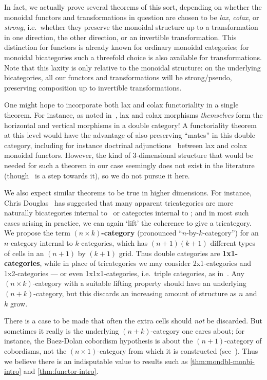 In fact, we actually prove several theorems of this sort, depending on whether the monoidal functors and transformations in question are chosen to be \emph{lax}, \emph{colax}, or \emph{strong}, i.e.\ whether they preserve the monoidal structure up to a transformation in one direction, the other direction, or an invertible transformation.
This distinction for functors is already known for ordinary monoidal categories; for monoidal bicategories such a threefold choice is also available for transformations.
Note that this laxity is only relative to the monoidal structure: on the underlying bicategories, all our functors and transformations will be strong/pseudo, preserving composition up to invertible transformations.

One might hope to incorporate both lax and colax functoriality in a single theorem.
For instance, as noted in~\cite{gp:double-adjoints,shulman:dblderived}, lax and colax morphisms \emph{themselves} form the horizontal and vertical morphisms in a double category!
A functoriality theorem at this level would have the advantage of also preserving ``mates'' in this double category, including for instance doctrinal adjunctions~\cite{kelly:doc-adjn} between lax and colax monoidal functors.
However, the kind of 3-dimensional structure that would be needed for such a theorem in our case seemingly does not exist in the literature (though~\cite{gp:intercategories-i} is a step towards it), so we do not pursue it here.

\begin{rmk}
We also expect similar theorems to be true in higher dimensions.  For
instance, Chris Douglas~\cite{douglas:tfttalk} has suggested that many
apparent tricategories are more naturally bicategories internal to
\cCat\ or categories internal to \cTwocat; and in most such cases
arising in practice, we can again `lift' the coherence to give a
tricategory.
%
We propose the term \textbf{$(n\times k)$-category}
(pronounced ``$n$-by-$k$-category'') for an $n$-category internal to
$k$-categories, which has $(n+1)(k+1)$ different types of
cells in an $(n+1)$ by $(k+1)$ grid.  Thus
double categories are \textbf{1x1-categories}, while in
place of tricategories we may consider 2x1-categories and
1x2-categories --- or even 1x1x1-categories, i.e.\ triple categories,
as in~\cite{gp:intercategories-i,gp:intercategories-ii}.  Any
$(n\times k)$-category with a suitable lifting property
should have an underlying $(n+k)$-category, but this discards an increasing amount of structure as $n$ and $k$ grow.



There is a case to be made that often the extra cells should
\emph{not} be discarded.  But sometimes
it really is the underlying $(n+k)$-category one cares about; for
instance, the Baez-Dolan cobordism hypothesis is about the $(n+1)$-category of cobordisms, not
the $(n\times 1)$-category from which it is constructed
(see~\cite{lurie:tft}).  Thus we believe there is an indisputable value to
results such as \autoref{thm:mondbl-monbi-intro} and \autoref{thm:functor-intro}.
\end{rmk}

